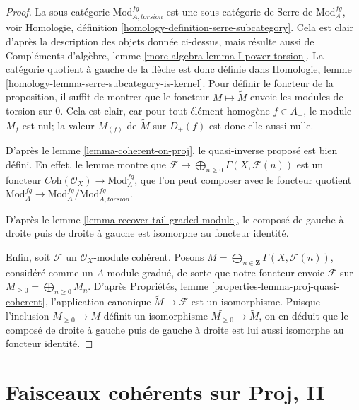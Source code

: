 \begin{proof}
La sous-catégorie $\text{Mod}^{fg}_{A, torsion}$ est une sous-catégorie de Serre
de $\text{Mod}^{fg}_A$, voir
Homologie, définition \ref{homology-definition-serre-subcategory}.
Cela est clair d'après la description des objets donnée ci-dessus, mais résulte aussi
de Compléments d'algèbre, lemme \ref{more-algebra-lemma-I-power-torsion}.
La catégorie quotient à gauche de la flèche est donc définie
dans Homologie, lemme \ref{homology-lemma-serre-subcategory-is-kernel}.
Pour définir le foncteur de la proposition, il suffit de montrer que
le foncteur $M \mapsto \widetilde M$ envoie les modules de torsion sur $0$.
Cela est clair, car pour tout élément homogène $f \in A_+$, le
module $M_f$ est nul; la valeur $M_{(f)}$ de $\widetilde M$
sur $D_+(f)$ est donc elle aussi nulle.

\medskip\noindent
D'après le lemme \ref{lemma-coherent-on-proj}, le quasi-inverse proposé
est bien défini. En effet, le lemme montre que
$\mathcal{F} \longmapsto \bigoplus_{n \geq 0} \Gamma(X, \mathcal{F}(n))$
est un foncteur $\textit{Coh}(\mathcal{O}_X) \to \text{Mod}^{fg}_A$,
que l'on peut composer avec le foncteur quotient
$\text{Mod}^{fg}_A \to \text{Mod}^{fg}_A/\text{Mod}^{fg}_{A, torsion}$.

\medskip\noindent
D'après le lemme \ref{lemma-recover-tail-graded-module},
le composé de gauche à droite puis de droite à gauche est isomorphe au foncteur identité.

\medskip\noindent
Enfin, soit $\mathcal{F}$ un $\mathcal{O}_X$-module cohérent.
Posons $M = \bigoplus_{n \in \mathbf{Z}} \Gamma(X, \mathcal{F}(n))$,
considéré comme un $A$-module gradué, de sorte que notre foncteur envoie $\mathcal{F}$ sur
$M_{\geq 0} = \bigoplus_{n \geq 0} M_n$.
D'après Propriétés, lemme \ref{properties-lemma-proj-quasi-coherent},
l'application canonique $\widetilde M \to \mathcal{F}$
est un isomorphisme. Puisque l'inclusion
$M_{\geq 0} \to M$ définit un isomorphisme
$\widetilde{M_{\geq 0}} \to \widetilde M$, on en déduit
que le composé de droite à gauche puis de gauche à droite est lui aussi
isomorphe au foncteur identité.
\end{proof}





\section{Faisceaux cohérents sur Proj, II}
\label{section-coherent-proj-general}

